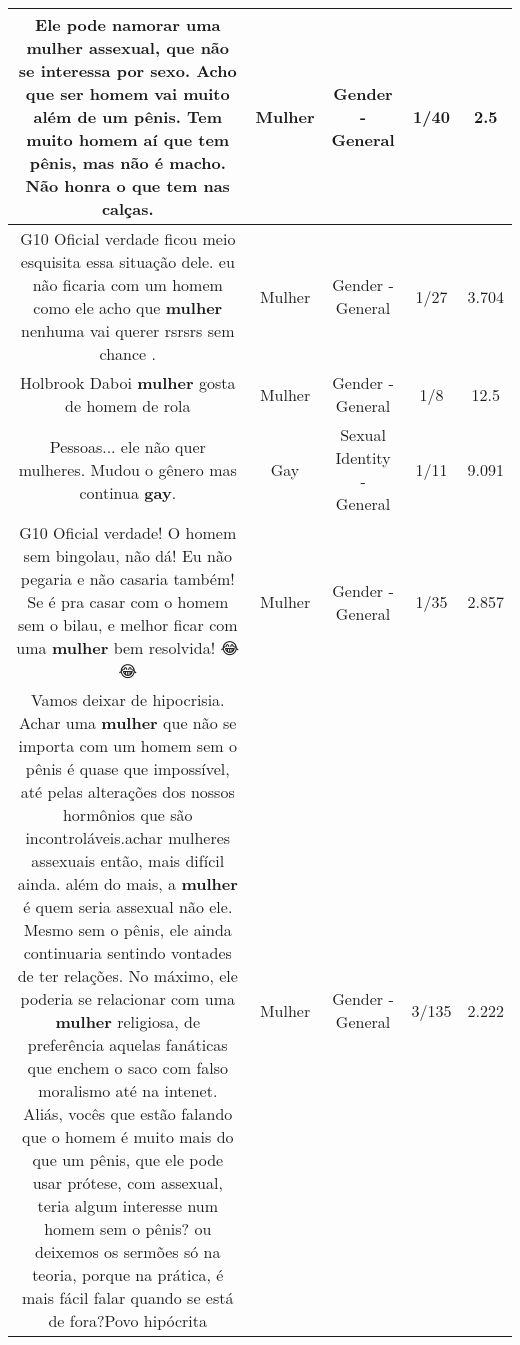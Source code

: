 \documentclass[11pt]{article}
\newlength\mylength
\begin{document}
\begin{center}
\begin{longtable}{|C{.65\mylength}|C{.30\mylength}|C{.12\mylength}|C{.12\mylength}|C{.12\mylength}|}
  \small Ele pode namorar uma \textbf{mulher} assexual, que não se interessa por sexo. Acho que ser homem vai muito além de um pênis. Tem muito homem aí que tem pênis, mas não é macho. Não honra o que tem nas calças.\normalsize   & Mulher & Gender - General & 1/40 & 2.5 \\  \hline
  \small G10 Oficial verdade ficou meio esquisita essa situação dele.  eu não ficaria com um homem como ele acho que \textbf{mulher} nenhuma vai querer rsrsrs sem chance .\normalsize   & Mulher & Gender - General & 1/27 & 3.704 \\  \hline
  \small Holbrook Daboi \textbf{mulher} gosta de homem de rola\normalsize   & Mulher & Gender - General & 1/8 & 12.5 \\  \hline
  \small Pessoas... ele não quer mulheres. Mudou o gênero mas continua \textbf{gay}.\normalsize   & Gay & Sexual Identity - General & 1/11 & 9.091 \\  \hline
  \small G10 Oficial  verdade! O homem sem bingolau, não dá! Eu não pegaria e não casaria também! Se é pra casar com o homem sem o bilau, e melhor ficar com uma \textbf{mulher} bem resolvida! 😂😂\normalsize   & Mulher & Gender - General & 1/35 & 2.857 \\  \hline
  \small Vamos deixar de hipocrisia. Achar uma \textbf{mulher} que não se importa com um homem sem o pênis é quase que impossível, até pelas alterações dos nossos hormônios que são incontroláveis.achar mulheres assexuais então, mais difícil ainda. além do mais, a \textbf{mulher} é quem seria assexual não ele. Mesmo sem o pênis, ele ainda continuaria sentindo vontades de ter relações. No máximo, ele poderia se relacionar com uma \textbf{mulher} religiosa, de preferência aquelas fanáticas que enchem o saco com falso moralismo até na intenet. Aliás, vocês que estão falando que o homem é muito mais do que um pênis, que ele pode usar prótese, com assexual, teria algum interesse num homem sem o pênis? ou deixemos os sermões só na teoria, porque na prática, é mais fácil falar quando se está de fora?Povo hipócrita\normalsize   & Mulher & Gender - General & 3/135 & 2.222 \\  \hline

\end{longtable}
\end{center}
\end{document}
